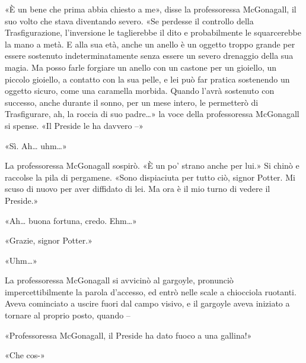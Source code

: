 «È un bene che prima abbia chiesto a me», disse la professoressa McGonagall, il suo volto che stava diventando severo. «Se perdesse il controllo della Trasfigurazione, l’inversione le taglierebbe il dito e probabilmente le squarcerebbe la mano a metà. E alla sua età, anche un anello è un oggetto troppo grande per essere sostenuto indeterminatamente senza essere un severo drenaggio della sua magia. Ma posso farle forgiare un anello con un castone per un gioiello, un piccolo gioiello, a contatto con la sua pelle, e lei può far pratica sostenendo un oggetto sicuro, come una caramella morbida. Quando l’avrà sostenuto con successo, anche durante il sonno, per un mese intero, le permetterò di Trasfigurare, ah, la roccia di suo padre…» la voce della professoressa McGonagall si spense. «Il Preside le ha davvero –»

«Sì. Ah… uhm…»

La professoressa McGonagall sospirò. «È un po’ strano anche per lui.» Si chinò e raccolse la pila di pergamene. «Sono dispiaciuta per tutto ciò, signor Potter. Mi scuso di nuovo per aver diffidato di lei. Ma ora è il mio turno di vedere il Preside.»

«Ah… buona fortuna, credo. Ehm…»

«Grazie, signor Potter.»

«Uhm…»

La professoressa McGonagall si avvicinò al gargoyle, pronunciò impercettibilmente la parola d’accesso, ed entrò nelle scale a chiocciola ruotanti. Aveva cominciato a uscire fuori dal campo visivo, e il gargoyle aveva iniziato a tornare al proprio posto, quando –

«Professoressa McGonagall, il Preside ha dato fuoco a una gallina!»

«Che cos-»



